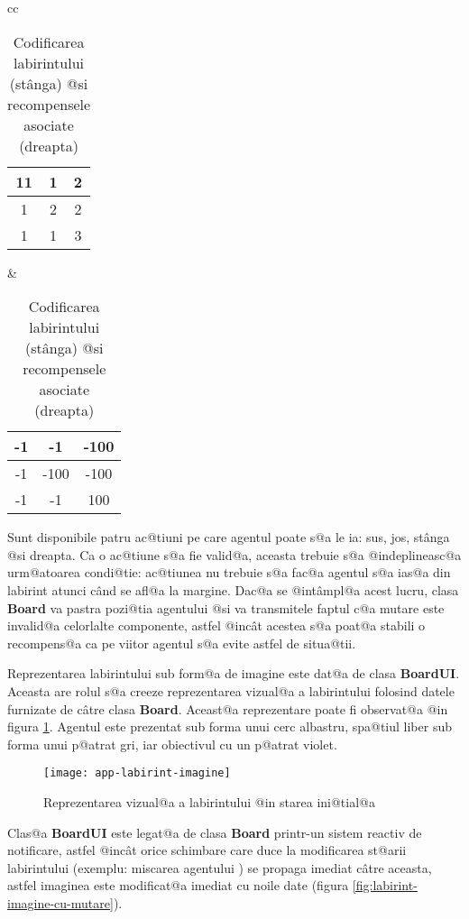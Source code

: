 \begin{table}[h]
	\begin{center}
		\begin{tabular}{cc}
			\begin{tabular}{|c|c|c|}
				\hline
				11 & 1 & 2 \\
				\hline
				1 & 2 & 2 \\
				\hline
				1 & 1 & 3 \\
				\hline
			\end{tabular} & 
			\begin{tabular}{|c|c|c|}
				\hline
				-1 & -1 & -100 \\
				\hline
				-1 & -100 & -100 \\
				\hline
				-1 & -1 & 100 \\
				\hline
			\end{tabular}
		\end{tabular}
	\end{center}
	\caption{Codificarea labirintului (st\^ anga) @si recompensele asociate (dreapta)}
	\label{tab:recompense-lab}
\end{table}

Sunt disponibile patru ac@tiuni pe care agentul poate s@a le ia: sus, jos, st\^ anga @si dreapta. Ca o ac@tiune s@a fie valid@a, aceasta trebuie s@a @indeplineasc@a urm@atoarea condi@tie: ac@tiunea nu trebuie s@a fac@a agentul s@a ias@a din labirint atunci c\^ and se afl@a la margine. Dac@a se @int\^ ampl@a acest lucru, clasa {\bf Board} va pastra pozi@tia agentului @si va transmitele faptul c@a mutare este invalid@a celorlalte componente, astfel @inc\^ at acestea s@a poat@a stabili o recompens@a ca pe viitor agentul s@a evite astfel de situa@tii.

Reprezentarea labirintului sub form@a de imagine este dat@a de clasa \textbf{BoardUI}. Aceasta are rolul s@a creeze reprezentarea vizual@a a labirintului folosind datele furnizate de c\^ atre clasa \textbf{Board}. Aceast@a reprezentare poate fi observat@a @in figura \ref{fig:labirint-imagine}. Agentul este prezentat sub forma unui cerc albastru, spa@tiul liber sub forma unui p@atrat gri, iar obiectivul cu un p@atrat violet.

\begin{figure}[h]
	\centering
	\texttt{[image: app-labirint-imagine]}
	\caption{Reprezentarea vizual@a a labirintului @in starea ini@tial@a}
	\label{fig:labirint-imagine}
\end{figure}


Clas@a \textbf{BoardUI} este legat@a de clasa \textbf{Board} printr-un sistem reactiv de notificare, astfel @inc\^ at orice schimbare care duce la modificarea st@arii labirintului (exemplu: miscarea agentului ) se propaga imediat c\^ atre aceasta, astfel imaginea este modificat@a imediat cu noile date (figura \ref{fig:labirint-imagine-cu-mutare}).

